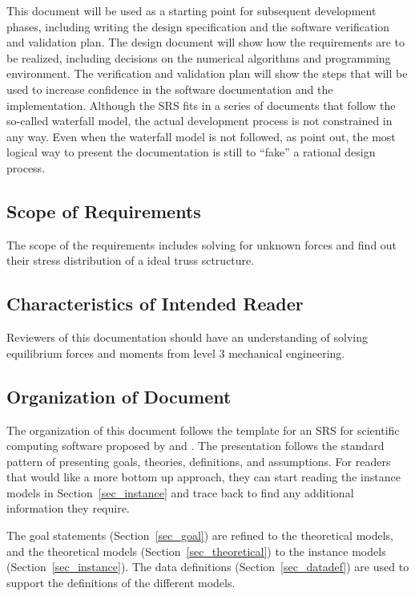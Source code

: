 \documentclass[12pt]{article}
\begin{document}
This document will be used as a starting point for subsequent development 
phases, including writing the design specification and the software 
verification and validation plan. The design document will show how the 
requirements are to be realized, including decisions on the numerical 
algorithms and programming environment. The verification and validation plan 
will show the steps that will be used to increase confidence in the software 
documentation and the implementation. Although the SRS fits in a series of 
documents that follow the so-called waterfall model, the actual development 
process is not constrained in any way. Even when the waterfall model is not 
followed, as \cite{ParnasandClements} point out, the most logical way to 
present the documentation is still to “fake” a rational design process.

\subsection{Scope of Requirements} 
The scope of the requirements includes solving for unknown forces and find out 
their stress distribution of a ideal truss sctructure.

\subsection{Characteristics of Intended Reader} \label{sec_IntendedReader}
Reviewers of this documentation should have an understanding of solving 
equilibrium forces and moments from level 3 mechanical engineering.

\subsection{Organization of Document}
The organization of this document follows the template for an SRS for 
scientific computing software proposed by \cite{SmithandLai2005} and 
\cite{Koothoor2013}. The presentation follows the standard pattern of 
presenting 
goals, theories, definitions, and assumptions. For readers that would like a 
more bottom up approach, they can start reading the instance models in 
Section~\ref{sec_instance} and trace back to find any additional information 
they require.

The goal statements (Section~\ref{sec_goal}) are refined to the theoretical 
models, and the theoretical models (Section~\ref{sec_theoretical}) to the 
instance models (Section~\ref{sec_instance}). The data definitions 
(Section~\ref{sec_datadef}) are used to support the definitions of the 
different models.
\end{document}
